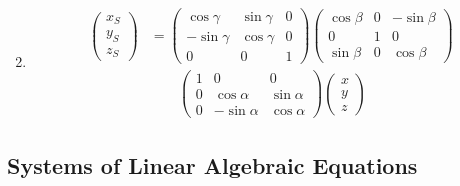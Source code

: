 \documentclass{article}
\begin{document}
\begin{enumerate}
  \setcounter{enumi}{1}
  \item

        \begin{align*}
          \begin{pmatrix}
            x_S \\
            y_S \\
            z_S
          \end{pmatrix} & = \begin{pmatrix}
                              \cos \gamma  & \sin \gamma & 0 \\
                              -\sin \gamma & \cos \gamma & 0 \\
                              0            & 0           & 1
                            \end{pmatrix} \begin{pmatrix}
                                            \cos \beta & 0 & -\sin \beta \\
                                            0          & 1 & 0           \\
                                            \sin \beta & 0 & \cos \beta
                                          \end{pmatrix} \\
                          & \qquad \begin{pmatrix}
                                     1 & 0            & 0           \\
                                     0 & \cos \alpha  & \sin \alpha \\
                                     0 & -\sin \alpha & \cos \alpha
                                   \end{pmatrix} \begin{pmatrix}
                                                   x \\
                                                   y \\
                                                   z
                                                 \end{pmatrix}
        \end{align*}
\end{enumerate}

\subsection{Systems of Linear Algebraic Equations}
\end{document}
